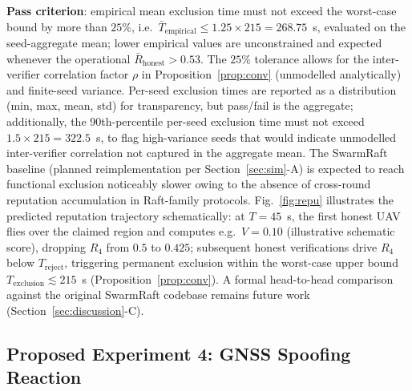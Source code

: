 \documentclass[conference,10pt]{IEEEtran}
\begin{document}
\textbf{Pass criterion}: empirical mean exclusion time must not exceed the worst-case bound by more than $25\%$, i.e.\ $\bar{T}_\text{empirical} \leq 1.25 \times 215 = 268.75$~s, evaluated on the seed-aggregate mean; lower empirical values are unconstrained and expected whenever the operational $\bar{R}_\text{honest} > 0.53$. The $25\%$ tolerance allows for the inter-verifier correlation factor $\rho$ in Proposition~\ref{prop:conv} (unmodelled analytically) and finite-seed variance. Per-seed exclusion times are reported as a distribution (min, max, mean, std) for transparency, but pass/fail is the aggregate; additionally, the 90th-percentile per-seed exclusion time must not exceed $1.5\times 215 = 322.5$~s, to flag high-variance seeds that would indicate unmodelled inter-verifier correlation not captured in the aggregate mean. %
The SwarmRaft baseline (planned reimplementation per Section~\ref{sec:sim}-A) is expected to reach functional exclusion noticeably slower owing to the absence of cross-round reputation accumulation in Raft-family protocols. Fig.~\ref{fig:repu} illustrates the predicted reputation trajectory schematically: at $T{=}45$~s, the first honest UAV flies over the claimed region and computes e.g.\ $V = 0.10$ (illustrative schematic score), dropping $R_4$ from $0.5$ to $0.425$; subsequent honest verifications drive $R_4$ below $T_\text{reject}$, triggering permanent exclusion within the worst-case upper bound $T_\text{exclusion}\lesssim 215$~s (Proposition~\ref{prop:conv}). A formal head-to-head comparison against the original SwarmRaft codebase remains future work (Section~\ref{sec:discussion}-C).

\subsection{Proposed Experiment 4: GNSS Spoofing Reaction}
\end{document}
